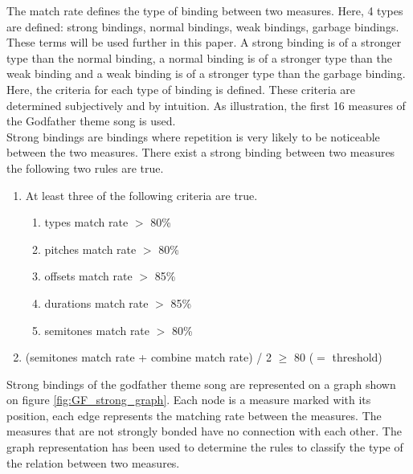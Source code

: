 The match rate defines the type of binding between two measures. Here, 4 types are defined: strong bindings, normal bindings, weak bindings, garbage bindings. These terms will be used further in this paper. A strong binding is of a stronger type than the normal binding, a normal binding is of a stronger type than the weak binding and a weak binding is of a stronger type than the garbage binding. Here, the criteria for each type of binding is defined. These criteria are determined subjectively and by intuition. As illustration, the first 16 measures of the Godfather theme song is used.
\\
Strong bindings are bindings where repetition is very likely to be noticeable between the two measures. There exist a strong binding between two measures the following two rules are true.
\begin{enumerate}
	\item At least three of the following criteria are true.
			\begin{enumerate}
				\item types match rate $>$ 80\%
				\item pitches match rate $>$ 80\%
				\item offsets match rate $>$ 85\%
				\item durations match rate $>$ 85\%
				\item semitones match rate $>$ 80\%
			\end{enumerate}
	\item (semitones match rate + combine match rate) / 2 $\geq$ 80 ($=$ threshold)
\end{enumerate}

Strong bindings of the godfather theme song are represented on a graph shown on figure \ref{fig:GF_strong_graph}. Each node is a measure marked with its position, each edge represents the matching rate between the measures. The measures that are not strongly bonded have no connection with each other. The graph representation has been used to  determine the rules to classify the type of the relation between two measures.

